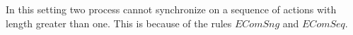 \begin{example}
  In this setting two process cannot synchronize on a sequence of actions with length greater than one. This is because of the rules $EComSng$ and $EComSeq$.
\end{example}



% 
% 
% 
